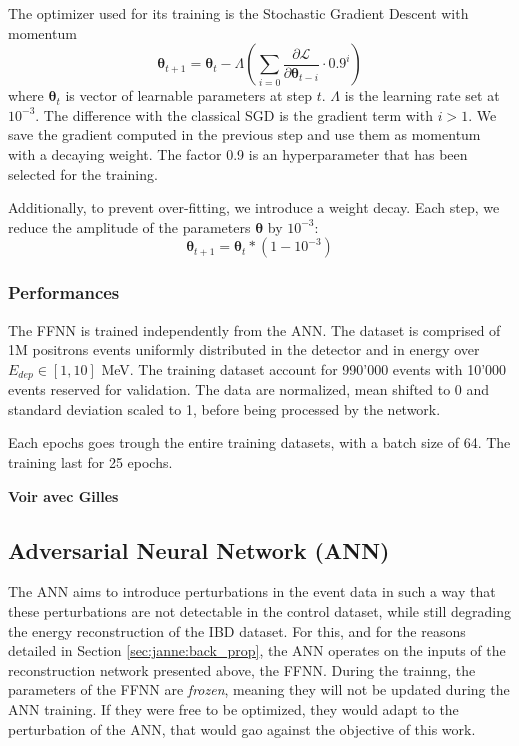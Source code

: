 \documentclass[../main.tex]{subfiles}
\begin{document}
The optimizer used for its training is the Stochastic Gradient Descent with momentum
\begin{equation}
  \bm{\theta}_{t+1} = \bm{\theta}_t - \Lambda \left(\sum_{i=0} \frac{\partial \mathcal{L}}{\partial \bm{\theta}_{t - i}} \cdot 0.9^{i} \right)
\end{equation}
where $\bm{\theta}_t$ is vector of learnable parameters at step $t$. $\Lambda$ is the learning rate set at  $10^{-3}$. The difference with the classical SGD is the gradient term with $i > 1$. We save the gradient computed in the previous step and use them as momentum with a decaying weight. The factor 0.9 is an hyperparameter that has been selected for the training.

Additionally, to prevent over-fitting, we introduce a weight decay. Each step, we reduce the amplitude of the parameters $\bm{\theta}$ by $10^{-3}$:
\begin{equation}
  \bm{\theta}_{t+1} = \bm{\theta}_t * (1 - 10^{-3})
\end{equation}

\subsubsection{Performances}

The FFNN is trained independently from the ANN. The dataset is comprised of 1M positrons events uniformly distributed in the detector and in energy over $E_{dep} \in [1, 10]$ MeV. The training dataset account for 990'000 events with 10'000 events reserved for validation. The data are normalized, mean shifted to 0 and standard deviation scaled to 1, before being processed by the network.

Each epochs goes trough the entire training datasets, with a batch size of 64. The training last for 25 epochs.

\textbf{Voir avec Gilles}

\subsection{Adversarial Neural Network (ANN)}
\label{sec:janne:arch:ann}

The ANN aims to introduce perturbations in the event data in such a way that these perturbations are not detectable in the control dataset, while still degrading the energy reconstruction of the IBD dataset. For this, and for the reasons detailed in Section \ref{sec:janne:back_prop}, the ANN operates on the inputs of the reconstruction network presented above, the FFNN. During the trainng, the parameters of the FFNN are \textit{frozen}, meaning they will not be updated during the ANN training. If they were free to be optimized, they would adapt to the perturbation of the ANN, that would gao against the objective of this work.
\end{document}
